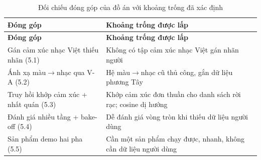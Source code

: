 \documentclass[../DoAn.tex]{subfiles}
\begin{document}
\begin{longtable}{|p{6.4cm}|p{7.2cm}|}
\caption{Đối chiếu đóng góp của đồ án với khoảng trống đã xác định}\label{table:contrib}\\
\hline
\textbf{Đóng góp} & \textbf{Khoảng trống được lấp} \\
\hline
\endfirsthead
\hline
\textbf{Đóng góp} & \textbf{Khoảng trống được lấp} \\
\hline
\endhead
Gán cảm xúc nhạc Việt thiếu nhãn (5.1) & Không có tập cảm xúc nhạc Việt gán nhãn người \\
\hline
Ánh xạ màu$\rightarrow$nhạc qua V-A (5.2) & Hệ màu$\rightarrow$nhạc cũ thủ công, gắn dữ liệu phương Tây \\
\hline
Truy hồi khớp cảm xúc + nhất quán (5.3) & Khớp cảm xúc đơn thuần cho danh sách rời rạc; cosine dị hướng \\
\hline
Đánh giá nhiều tầng + bake-off (5.4) & Dễ đánh giá vòng tròn khi thiếu dữ liệu người dùng \\
\hline
Sản phẩm demo hai pha (5.5) & Cần một sản phẩm chạy được, nhanh, không cần dữ liệu người dùng \\
\hline
\end{longtable}
\end{document}
